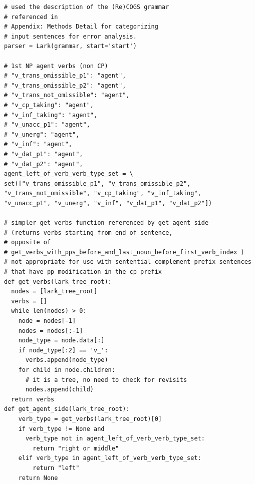 \documentclass[11pt]{article}
\begin{document}
\begin{tiny}
\begin{verbatim}
# used the description of the (Re)COGS grammar 
# referenced in 
# Appendix: Methods Detail for categorizing
# input sentences for error analysis.
parser = Lark(grammar, start='start')

# 1st NP agent verbs (non CP)
# "v_trans_omissible_p1": "agent",
# "v_trans_omissible_p2": "agent",
# "v_trans_not_omissible": "agent",
# "v_cp_taking": "agent",
# "v_inf_taking": "agent",
# "v_unacc_p1": "agent",
# "v_unerg": "agent",
# "v_inf": "agent",
# "v_dat_p1": "agent",
# "v_dat_p2": "agent",
agent_left_of_verb_verb_type_set = \
set(["v_trans_omissible_p1", "v_trans_omissible_p2", 
"v_trans_not_omissible", "v_cp_taking", "v_inf_taking", 
"v_unacc_p1", "v_unerg", "v_inf", "v_dat_p1", "v_dat_p2"])

# simpler get_verbs function referenced by get_agent_side
# (returns verbs starting from end of sentence, 
# opposite of 
# get_verbs_with_pps_before_and_last_noun_before_first_verb_index )
# not appropriate for use with sentential complement prefix sentences
# that have pp modification in the cp prefix
def get_verbs(lark_tree_root):
  nodes = [lark_tree_root]
  verbs = []
  while len(nodes) > 0:
    node = nodes[-1]
    nodes = nodes[:-1]
    node_type = node.data[:]
    if node_type[:2] == 'v_':
      verbs.append(node_type)
    for child in node.children:
      # it is a tree, no need to check for revisits
      nodes.append(child)
  return verbs
def get_agent_side(lark_tree_root):
    verb_type = get_verbs(lark_tree_root)[0]
    if verb_type != None and 
      verb_type not in agent_left_of_verb_verb_type_set:
        return "right or middle"
    elif verb_type in agent_left_of_verb_verb_type_set:
        return "left"
    return None


\end{verbatim}
\end{tiny}
\end{document}

